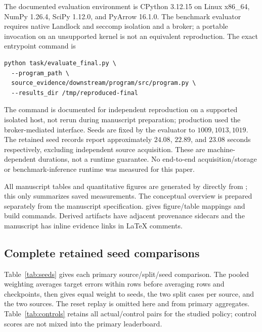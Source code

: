 \documentclass{article}
\begin{document}
The documented evaluation environment is CPython 3.12.15 on Linux x86\_64, NumPy 1.26.4, SciPy 1.12.0, and PyArrow 16.1.0. The benchmark evaluator requires native Landlock and seccomp isolation and a broker; a portable invocation on an unsupported kernel is not an equivalent reproduction. The exact entrypoint command is
\begin{samepage}
\begin{verbatim}
python task/evaluate_final.py \
  --program_path \
  source_evidence/downstream/program/src/program.py \
  --results_dir /tmp/reproduced-final
\end{verbatim}
\end{samepage}
The command is documented for independent reproduction on a supported isolated host, not rerun during manuscript preparation; production used the broker-mediated interface. Seeds are fixed by the evaluator to $1009,1013,1019$. The retained seed records report approximately $24.08$, $22.89$, and $23.08$ seconds respectively, excluding independent source acquisition. These are machine-dependent durations, not a runtime guarantee. No end-to-end acquisition/storage or benchmark-inference runtime was measured for this paper.

All manuscript tables and quantitative figures are generated by  directly from ; this only summarizes saved measurements. The conceptual overview is prepared separately from the manuscript specification.  gives figure/table mappings and build commands. Derived artifacts have adjacent provenance sidecars and the manuscript has inline evidence links in LaTeX comments.

\subsection{Complete retained seed comparisons}
Table~\ref{tab:seeds} gives each primary source/split/seed comparison. The pooled weighting averages target errors within rows before averaging rows and checkpoints, then gives equal weight to seeds, the two split cases per source, and the two sources. The reset replay is omitted here and from primary aggregates. Table~\ref{tab:controls} retains all actual/control pairs for the studied policy; control scores are not mixed into the primary leaderboard.
\end{document}
